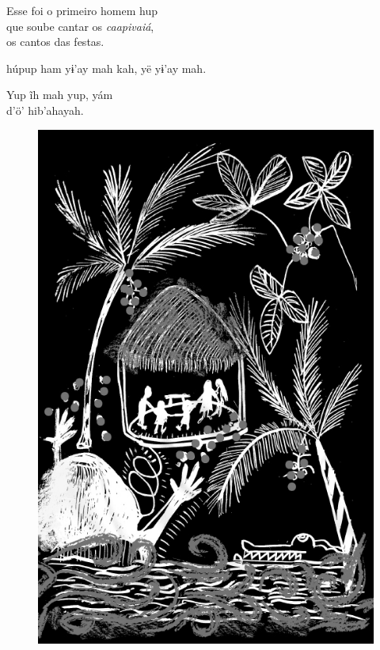 Esse foi o primeiro homem hup\\
que soube cantar os \textit{caapivaiá},\\
os cantos das festas.

\vspace{2em}

 húpup ham
yɨ’ay mah kah, yë
yɨ’ay mah.

\medskip

Yup ĩh mah yup, yám\\
d’ö’ hib’ahayah.

\vspace*{\fill}

\begin{figure}
\vspace*{-2cm}
\hspace*{-2.4cm}\includegraphics[width=142mm]{./imgs/img8.jpg}
\end{figure}


